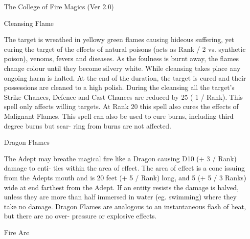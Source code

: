 \begin{Chapter}{The College of Fire Magics (Ver 2.0)}
\begin{spell}[S-1]{Cleansing Flame }
\begin{effects}
 The  target  is  wreathed  in  yellowy  green 
flames  causing  hideous  suffering,  yet  curing  the 
target  of  the  effects  of  natural  poisons  (acts  as 
Rank / 2 vs. synthetic poison), venoms, fevers and 
diseases. As the foulness is burnt away, the flames 
change  colour  until  they  become  silvery  white. 
While  cleansing  takes  place  any  ongoing  harm  is 
halted.  At  the  end  of  the  duration,  the  target  is 
cured  and  their  possessions  are  cleaned  to  a  high 
polish.  During  the  cleansing  all  the  target’s  Strike 
Chances,  Defence  and  Cast  Chances  are  reduced 
by  25  (-1  /  Rank).  This  spell  only  affects  willing 
targets. At Rank 20 this spell also cures the effects 
of Malignant Flames. This spell can also be used to 
cure  burns,  including  third  degree  burns  but  scar-
ring from burns are not affected. 

\end{effects}
\end{spell}

\begin{spell}[S-2]{Dragon Flames }

\begin{effects}
The Adept may breathe magical fire like a 
Dragon  causing  D10  (+ 3 / Rank)  damage  to  enti-
ties within the area of effect. The area of effect is a 
cone issuing from the Adepts mouth and is 20 feet 
(+  5  /  Rank)  long,  and  5  (+  5  /  3  Ranks)  wide  at 
end farthest from the Adept. If an entity resists the 
damage  is  halved,  unless  they  are  more  than  half 
immersed in water (eg. swimming) where they take 
no  damage.  Dragon  Flames  are  analogous  to  an 
instantaneous  flash  of  heat,  but  there  are  no  over-
pressure or explosive effects. 

\end{effects}
\end{spell}

\begin{spell}[S-3]{Fire Arc }


\end{spell}
\end{Chapter}
